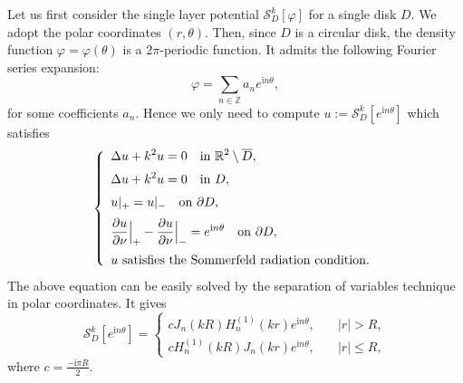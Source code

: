 \documentclass[11pt]{article}
\numberwithin{equation}{section}
\newcommand{\ds}{\displaystyle}
\def\nm{\noalign{\medskip}}
\def\ri{{\mathrm{i}}}
\newcommand\1{{\ensuremath {\mathds 1} }}
\newcommand{\pd}[2]{\frac{\partial #1}{\partial #2}}
\begin{document}
{{%
Let us first consider the single layer potential $\mathcal{S}_D^k[\varphi]$ for a single disk $D$. We adopt the polar coordinates $(r,\theta)$. Then, since $D$ is a circular disk, the density function $\varphi=\varphi(\theta)$ is a $2\pi$-periodic function. It admits the following Fourier series expansion:
$$
\varphi = \sum_{n\in\mathbb{Z}} a_n e^{\ri n\theta},
$$
for some coefficients $a_n$.
Hence we only need to compute $u:=\mathcal{S}_D^{k}[e^{\ri n\theta}]$ which satisfies
\begin{equation} %
\left\{
\begin{array}{ll}
\ds  \Delta u + k^2 u=0 \quad  \mbox{in } \mathbb{R}^2\setminus
\overline{D}, \\
\nm
\ds \Delta u + k^2  u=0 \quad  \mbox{in } D, \\
\nm
\ds u|_{+}=u|_{-} \quad \mbox{on } \p D, \\
\nm
\ds  \pd{u}{\nu} \Big|_{+} - \pd{u}{\nu} \Big|_{-} = e^{\ri n\theta} \quad \mbox{on } \p D, \\
\nm u \mbox{ satisfies the Sommerfeld radiation condition}.
\end{array}
\right.
\end{equation}
The above equation can be easily solved by the separation of variables technique in polar coordinates. It gives
\begin{equation}
\label{SingleLayer_multipole}
\mathcal{S}_D^{k}[e^{\ri n\theta}] = 
\begin{cases}
\ds c J_n(k R) H_n^{(1)}(k r)e^{\ri n\theta}, &\quad |r|>R,
\\[0.5em]
\ds c H_n^{(1)}(k R) J_n(k r)e^{\ri n\theta}, &\quad |r|\leq R,
\end{cases}
\end{equation}
where $c=\frac{-\ri \pi R}{2}$.

}}
\end{document}

